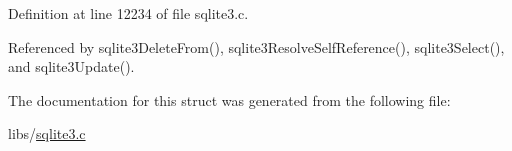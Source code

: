 Definition at line 12234 of file sqlite3.\+c.



Referenced by sqlite3\+Delete\+From(), sqlite3\+Resolve\+Self\+Reference(), sqlite3\+Select(), and sqlite3\+Update().



The documentation for this struct was generated from the following file\+:\begin{DoxyCompactItemize}
\item 
libs/\hyperlink{sqlite3_8c}{sqlite3.\+c}\end{DoxyCompactItemize}
